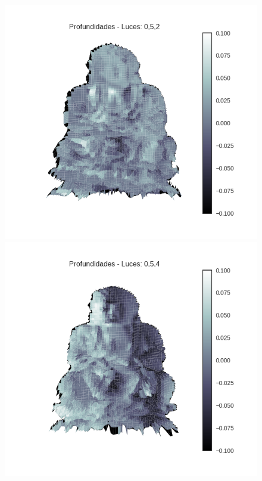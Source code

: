\begin{figure}[H]
\centering
\begin{minipage}{.5\textwidth}
  \centering
  \includegraphics[width=1\linewidth]{informe/imagenes/profundidades/buda052.png}
\end{minipage}%
\begin{minipage}{.5\textwidth}
  \centering
    \includegraphics[width=1\linewidth]{informe/imagenes/profundidades/buda054.png}
\end{minipage}
\end{figure}


